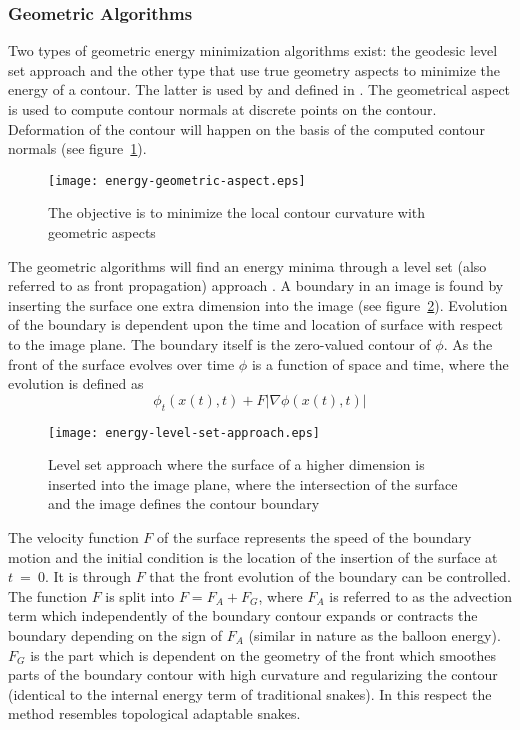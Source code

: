 \subsubsection{Geometric Algorithms}
\label{sec:geometric-algorithms}

Two types of geometric energy minimization algorithms exist: the
geodesic level set approach and the other type that use true geometry
aspects to minimize the energy of a contour. The latter is used by
\citet{williams97} and defined in \citep{lobregt95}. The geometrical
aspect is used to compute contour normals at discrete points on the
contour. Deformation of the contour will happen on the basis of the
computed contour normals (see
figure~\ref{fig:energy-geometric-aspect}).
\begin{figure}[htbp]
  \centering
  \texttt{[image: energy-geometric-aspect.eps]}
  \caption{The objective is to minimize the local contour curvature with geometric aspects}
  \label{fig:energy-geometric-aspect}
\end{figure}


The geometric  algorithms will find  an energy minima through  a level
set    (also   referred    to   as    front    propagation)   approach
\citep{osher88,malladi95,lorigo98,wang98,wang98b}.   A boundary  in an
image is found  by inserting the surface one  extra dimension into the
image (see  figure~\ref{fig:energy-level-set-approach}).  Evolution of
the boundary is  dependent upon the time and  location of surface with
respect to  the image  plane. The boundary  itself is  the zero-valued
contour  of $\phi$.  As  the front  of the  surface evolves  over time
$\phi$ is a function of space and time, where the evolution is defined
as
\begin{equation}
  \nonumber
  \phi_t(x(t), t) + F \lvert \nabla\phi(x(t), t) \rvert
\end{equation}
\begin{figure}[htbp]
  \centering
  \texttt{[image: energy-level-set-approach.eps]}
  \caption{Level set approach where the surface of a higher dimension
    is inserted into the image plane, where the intersection of the
    surface and the image defines the contour boundary}
  \label{fig:energy-level-set-approach}
\end{figure}
The velocity function $F$ of the surface represents the speed of the
boundary motion and the initial condition is the location of the
insertion of the surface at $t~=~0$. It is through $F$ that the front
evolution of the boundary can be controlled. The function $F$ is split
into $F = F_A + F_G$, where $F_A$ is referred to as the advection term
which independently of the boundary contour expands or contracts the
boundary depending on the sign of $F_A$ (similar in nature as the
balloon energy). $F_G$ is the part which is dependent on the geometry
of the front which smoothes parts of the boundary contour with high
curvature and regularizing the contour (identical to the internal
energy term of traditional snakes). In this respect the method
resembles topological adaptable snakes.

